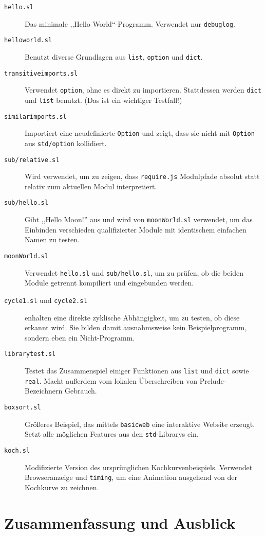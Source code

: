 \documentclass[runningheads]{llncs}
\begin{document}
\begin{description}
 \item[\texttt{hello.sl}] Das minimale ,,Hello World``-Programm. Verwendet
   nur \verb|debuglog|.
 \item[\texttt{helloworld.sl}] Benutzt diverse Grundlagen aus \verb|list|,
   \verb|option| und \verb|dict|.
 \item[\texttt{transitiveimports.sl}] Verwendet \verb|option|, ohne es direkt
   zu importieren. Stattdessen werden \verb|dict| und \verb|list| benutzt.
   (Das ist ein wichtiger Testfall!)
 \item[\texttt{similarimports.sl}] Importiert eine neudefinierte \verb|Option|
   und zeigt, dass sie nicht mit \verb|Option| aus \verb|std/option| kollidiert.
 \item[\texttt{sub/relative.sl}] Wird verwendet, um zu zeigen, dass
    \texttt{require.js} Modulpfade absolut statt relativ zum aktuellen
    Modul interpretiert.
 \item[\texttt{sub/hello.sl}] Gibt ,,Hello Moon!'' aus und wird von
   \texttt{moonWorld.sl} verwendet, um das Einbinden verschieden
   qualifizierter Module mit identischem einfachen Namen zu testen.
 \item[\texttt{moonWorld.sl}] Verwendet \texttt{hello.sl} und
   \texttt{sub/hello.sl}, um zu prüfen, ob die beiden Module getrennt
   kompiliert und eingebunden werden.
 \item[\texttt{cycle1.sl} \textnormal{und} \texttt{cycle2.sl}] enhalten eine
   direkte zyklische Abhängigkeit, um zu testen, ob diese erkannt wird. Sie
   bilden damit ausnahmsweise kein Beispielprogramm, sondern eben ein 
   Nicht-Programm.
 \item[\texttt{librarytest.sl}] Testet das Zusammenspiel einiger Funktionen aus
   \verb|list| und \verb|dict| sowie \verb|real|. Macht außerdem vom lokalen
   Überschreiben von Prelude-Bezeichnern Gebrauch.
 \item[\texttt{boxsort.sl}] Größeres Beispiel, das mittels \verb|basicweb| eine
   interaktive Website erzeugt. Setzt alle möglichen Features aus den
   \verb|std|-Librarys ein.
 \item[\texttt{koch.sl}] Modifizierte Version des ursprünglichen
   Kochkurvenbeispiels. Verwendet Browseranzeige und \verb|timing|, um eine
   Animation ausgehend von der Kochkurve zu zeichnen.
\end{description}

\section{Zusammenfassung und Ausblick}
\end{document}
